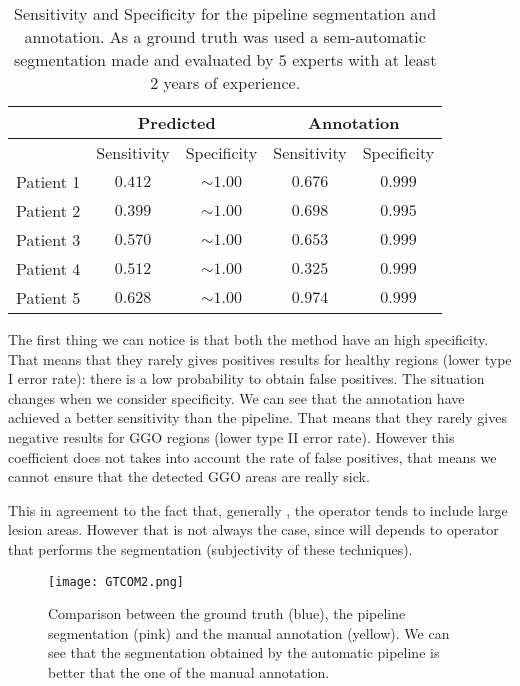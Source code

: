 \documentclass{standalone}
\begin{document}
		\begin{table}[h!]
		\centering
		\begin{tabular}{|c|c|c|c|c|}
			\hline
			\multirow{2}{*}{}		  & \multicolumn{2}{c|}{Predicted} & \multicolumn{2}{c|}{Annotation} \\ \hline
						& Sensitivity & Specificity	 		& Sensitivity & Specificity		 \\ \hline
			Patient 1	& $0.412$	  &	$\sim 1.00$			&	$0.676$	  &	$ 0.999$ 		 \\ 
			Patient 2	& $0.399$	  & $\sim 1.00$ 		&	$0.698$	  & $ 0.995$		 \\
			Patient 3	& $0.570$	  &	$\sim 1.00$			&	$0.653$	  & $ 0.999$		 \\
			Patient 4	& $0.512$	  & $\sim 1.00$			&	$0.325$	  & $ 0.999$		 \\
			Patient 5 	& $0.628$	  & $\sim 1.00$			&	$0.974$	  &	$ 0.999$		 \\ \hline
		\end{tabular}\caption{Sensitivity and Specificity for the pipeline segmentation and annotation. As a ground truth was used a sem-automatic segmentation made and evaluated by $5$ experts with at least $2$ years of experience.}\label{tab:Measures}
		
	\end{table}

 	The first thing we can notice is that both the method have an high specificity. That means that  they rarely gives positives results for healthy regions (lower type I error rate): there is a low probability to obtain false positives. 
 	The situation changes when we consider specificity. We can see that the annotation have achieved a better sensitivity than the pipeline. That means that they rarely gives negative results for GGO regions (lower type II error rate). However this coefficient does not takes into account the rate of false positives, that means we cannot ensure that the detected GGO areas are really sick.
 	
 	This in agreement to the fact that, generally , the operator tends to include large lesion areas. However that is not always the case, since will depends to operator that performs the segmentation (subjectivity of these techniques).
 	
 	
 	\begin{figure}[h!]
 		\texttt{[image: GTCOM2.png]}
 		
 		\caption{Comparison between the ground truth (blue), the pipeline segmentation (pink) and the manual annotation (yellow). We can see that the segmentation obtained by the automatic pipeline is better that the one of the manual annotation.}\label{fig:conf2}
 	\end{figure}
 
\end{document}
